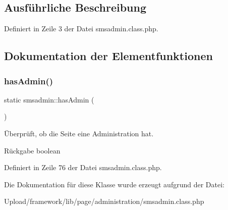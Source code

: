 \subsection{Ausführliche Beschreibung}


Definiert in Zeile 3 der Datei smsadmin.\+class.\+php.



\subsection{Dokumentation der Elementfunktionen}
\mbox{\label{classsmsadmin_af032368d2459cf2d5afb8d504d678abd}} 
\subsubsection{\texorpdfstring{has\+Admin()}{hasAdmin()}}
{\footnotesize\ttfamily static smsadmin\+::has\+Admin (\begin{DoxyParamCaption}{ }\end{DoxyParamCaption})\hspace{0.3cm}{\ttfamily [static]}}

Überprüft, ob die Seite eine Administration hat. \begin{DoxyReturn}{Rückgabe}
boolean 
\end{DoxyReturn}


Definiert in Zeile 76 der Datei smsadmin.\+class.\+php.



Die Dokumentation für diese Klasse wurde erzeugt aufgrund der Datei\+:\begin{DoxyCompactItemize}
\item 
Upload/framework/lib/page/administration/smsadmin.\+class.\+php\end{DoxyCompactItemize}
